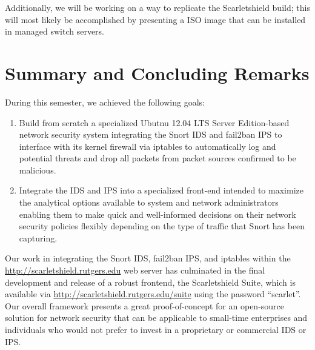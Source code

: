 \documentclass[12pt,letterpaper,titlepage]{report}
\begin{document}
{Additionally, we will be working on a way to replicate the Scarletshield
build; this will most likely be accomplished by presenting a ISO image that
can be installed in managed switch servers.

\section{Summary and Concluding Remarks}

During this semester, we achieved the following goals:

\begin{enumerate}
\item Build from scratch a specialized Ubutnu 12.04 LTS Server Edition-based
 network security system integrating the Snort IDS and fail2ban IPS to interface
  with its kernel firewall via iptables to automatically log and potential threats
   and drop all packets from packet sources confirmed to be malicious.
   
\item Integrate the IDS and IPS into a specialized front-end intended to maximize 
the analytical options available to system and network administrators enabling them 
to make quick and well-informed decisions on their network security policies flexibly 
depending on the type of traffic that Snort has been capturing. 
\end{enumerate}


Our work in integrating the Snort IDS, fail2ban IPS, and iptables within the 
\url{http://scarletshield.rutgers.edu} web server has culminated in the final 
development and release of a robust frontend, the Scarletshield Suite, which is
available via \url{http://scarletshield.rutgers.edu/suite} using the password 
“scarlet”. Our overall framework presents a great proof-of-concept for an open-source
solution for network security that can be applicable to small-time enterprises and
individuals who would not prefer to invest in a proprietary or commercial IDS or IPS. 

}
\end{document}
